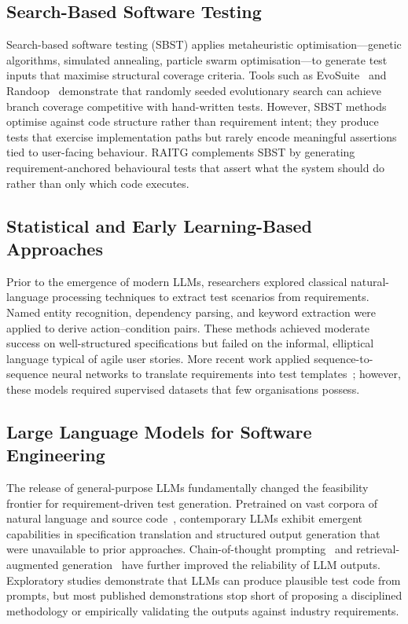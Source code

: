 \documentclass[conference]{IEEEtran}
\begin{document}
\subsection{Search-Based Software Testing}

Search-based software testing (SBST) applies metaheuristic optimisation---genetic algorithms, simulated annealing, particle swarm optimisation---to generate test inputs that maximise structural coverage criteria. Tools such as EvoSuite~\cite{evosuite2011} and Randoop~\cite{randoop2007} demonstrate that randomly seeded evolutionary search can achieve branch coverage competitive with hand-written tests. However, SBST methods optimise against code structure rather than requirement intent; they produce tests that exercise implementation paths but rarely encode meaningful assertions tied to user-facing behaviour. RAITG complements SBST by generating requirement-anchored behavioural tests that assert what the system should do rather than only which code executes.

\subsection{Statistical and Early Learning-Based Approaches}

Prior to the emergence of modern LLMs, researchers explored classical natural-language processing techniques to extract test scenarios from requirements. Named entity recognition, dependency parsing, and keyword extraction were applied to derive action--condition pairs. These methods achieved moderate success on well-structured specifications but failed on the informal, elliptical language typical of agile user stories. More recent work applied sequence-to-sequence neural networks to translate requirements into test templates~\cite{tufano2020}; however, these models required supervised datasets that few organisations possess.

\subsection{Large Language Models for Software Engineering}

The release of general-purpose LLMs fundamentally changed the feasibility frontier for requirement-driven test generation. Pretrained on vast corpora of natural language and source code~\cite{brown2020,codex2021}, contemporary LLMs exhibit emergent capabilities in specification translation and structured output generation that were unavailable to prior approaches. Chain-of-thought prompting~\cite{cot2022} and retrieval-augmented generation~\cite{rag2020} have further improved the reliability of LLM outputs. Exploratory studies demonstrate that LLMs can produce plausible test code from prompts, but most published demonstrations stop short of proposing a disciplined methodology or empirically validating the outputs against industry requirements.
\end{document}
